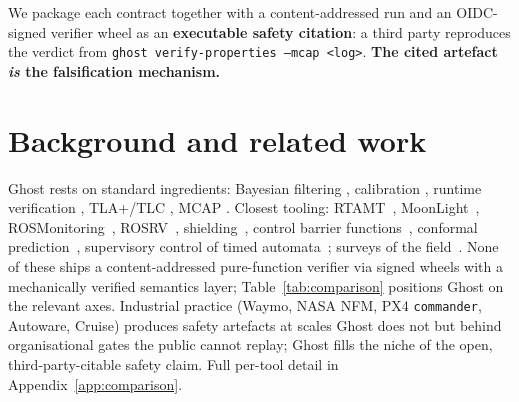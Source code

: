 \documentclass[11pt,a4paper]{article}
\begin{document}
We package each contract together with a content-addressed run
and an OIDC-signed verifier wheel as an \textbf{executable safety
citation}: a third party reproduces the verdict from
\texttt{ghost verify-properties --mcap <log>}. \textbf{The cited
artefact \emph{is} the falsification mechanism.}

\section{Background and related work}
\label{sec:related}

Ghost rests on standard ingredients: Bayesian filtering
\cite{thrun2005}, calibration \cite{vovk2005}, runtime
verification \cite{bartocci2018}, TLA+/TLC \cite{lamport2002},
MCAP \cite{foxglove2022}. Closest tooling:
RTAMT~\cite{rtamt2020}, MoonLight~\cite{moonlight2020},
ROSMonitoring~\cite{rosmonitoring2020}, ROSRV~\cite{rosrv2014},
shielding~\cite{shielding2020}, control barrier
functions~\cite{cbf2023}, conformal prediction~\cite{lindemann2023},
supervisory control of timed automata~\cite{timedaut2022};
surveys of the field~\cite{rizaldi2020}. None of these ships a
content-addressed pure-function verifier via signed wheels with
a mechanically verified semantics layer; Table~\ref{tab:comparison}
positions Ghost on the relevant axes. Industrial practice (Waymo,
NASA NFM, PX4 \texttt{commander}, Autoware, Cruise) produces
safety artefacts at scales Ghost does not but behind organisational
gates the public cannot replay; Ghost fills the niche of the open,
third-party-citable safety claim. Full per-tool detail in
Appendix~\ref{app:comparison}.
\end{document}

